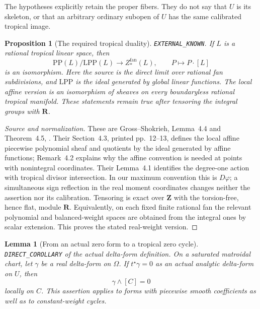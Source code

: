\documentclass[11pt,a4paper]{article}
\numberwithin{equation}{section}
\newtheorem{lemma}[theorem]{Lemma}
\newtheorem{proposition}[theorem]{Proposition}
\theoremstyle{definition}
\theoremstyle{remark}
\begin{document}
The hypotheses explicitly retain the proper fibers.  They do not say
that $U$ is its skeleton, or that an arbitrary ordinary subopen of $U$
has the same calibrated tropical image.

\begin{proposition}[The required tropical duality]
\label{prop:r6-matroidal-cocycle-input}
\textnormal{\texttt{EXTERNAL\_KNOWN}.}
If $L$ is a rational tropical linear space, then
\[
 \mathrm{PP}(L)/\mathrm{LPP}(L)
       \longrightarrow Z_*^{\mathrm{fan}}(L),
       \qquad P\longmapsto P\cdot[L]
\]
is an isomorphism.  Here the source is the direct limit over rational
fan subdivisions, and $\mathrm{LPP}$ is the ideal generated by global
linear functions.  The local affine version is an isomorphism of
sheaves on every boundaryless rational tropical manifold.  These
statements remain true after tensoring the integral groups with
$\mathbf R$.
\end{proposition}

\begin{proof}[Source and normalization]
These are Gross--Shokrieh, Lemma~4.4 and Theorem~4.5,
\cite[printed pp.~13--14]{GS21}.  Their Section~4.3, printed pp.~12--13,
defines the local affine piecewise polynomial sheaf and quotients by
the ideal generated by affine functions; Remark~4.2 explains why the
affine convention is needed at points with nonintegral coordinates.
Their Lemma~4.1 identifies the degree-one action with tropical divisor
intersection.  In our maximum convention this is $D\varphi$; a
simultaneous sign reflection in the real moment coordinates changes
neither the assertion nor its calibration.  Tensoring is exact over
$\mathbf Z$ with the torsion-free, hence flat, module $\mathbf R$.
Equivalently, on each fixed finite rational fan the relevant
polynomial and balanced-weight spaces are obtained from the integral
ones by scalar extension.  This proves the stated real-weight version.
\end{proof}

\begin{lemma}[From an actual zero form to a tropical zero cycle]
\label{lem:r6-matroidal-actual-detector}
\textnormal{\texttt{DIRECT\_COROLLARY}} of the actual delta-form definition.
On a saturated matroidal chart, let $\gamma$ be a real delta-form on
$\Omega$. If $t^\star\gamma=0$ as an actual analytic delta-form on
$U$, then
\[
                         \gamma\wedge[C]=0
\]
locally on $C$. This assertion applies to forms with piecewise smooth
coefficients as well as to constant-weight cycles.
\end{lemma}
\end{document}
